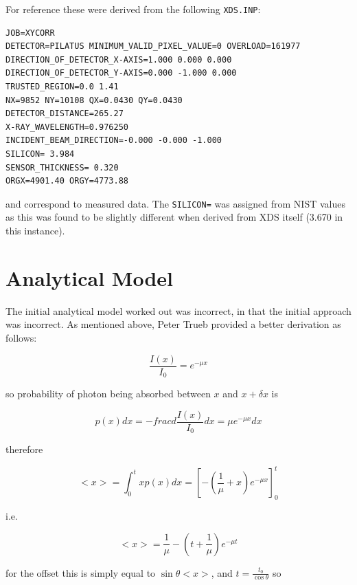 \documentclass{article}
\begin{document}
\noindent
For reference these were derived from the following \verb|XDS.INP|:

{\small
\begin{verbatim}
JOB=XYCORR
DETECTOR=PILATUS MINIMUM_VALID_PIXEL_VALUE=0 OVERLOAD=161977
DIRECTION_OF_DETECTOR_X-AXIS=1.000 0.000 0.000
DIRECTION_OF_DETECTOR_Y-AXIS=0.000 -1.000 0.000
TRUSTED_REGION=0.0 1.41
NX=9852 NY=10108 QX=0.0430 QY=0.0430
DETECTOR_DISTANCE=265.27
X-RAY_WAVELENGTH=0.976250
INCIDENT_BEAM_DIRECTION=-0.000 -0.000 -1.000
SILICON= 3.984
SENSOR_THICKNESS= 0.320
ORGX=4901.40 ORGY=4773.88
\end{verbatim}
}

\noindent
and correspond to measured data. The \verb|SILICON=| was assigned
from NIST values as this was found to be slightly different when
derived from XDS itself (3.670 in this instance). 

\section{Analytical Model}

The initial analytical model worked out was incorrect, in that the
initial approach was incorrect. As mentioned above, Peter Trueb
provided a better derivation as follows:

\begin{equation}
\frac{I(x)}{I_0} = e^{- \mu x}
\end{equation}

\noindent
so probability of photon being absorbed between $x$ and $x + \delta x$
is

\begin{equation}
p(x) dx = - frac{d \frac{I(x)}{I_0}}{dx} = \mu e^{- \mu x} dx
\end{equation}

\noindent
therefore 

\begin{equation}
<x> = \int_0^t x p(x) dx = \left[ - \left( \frac{1}{\mu} + x \right) 
e^{- \mu x} \right]_0^t
\end{equation}

\noindent
i.e.

\begin{equation}
<x> = \frac{1}{\mu} - \left( t + \frac{1}{\mu} \right) e^{- \mu t}
\end{equation}

\noindent
for the offset this is simply equal to $\sin \theta <x>$, and $t =
\frac{t_0}{\cos \theta}$ so
\end{document}

